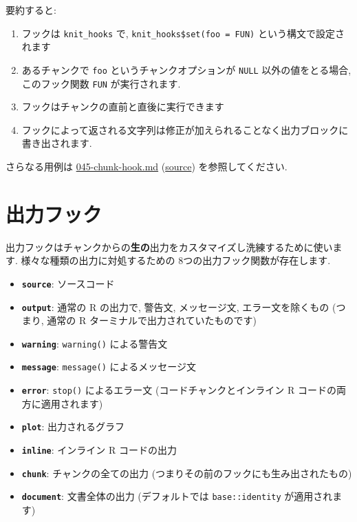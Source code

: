 \documentclass[
]{bxjsreport}
\providecommand{\tightlist}{%
  \setlength{\itemsep}{0pt}\setlength{\parskip}{0pt}}
\begin{document}
要約すると:

\begin{enumerate}
\def\labelenumi{\arabic{enumi}.}
\tightlist
\item
  フックは \texttt{knit\_hooks} で,
  \texttt{knit\_hooks\$set(foo\ =\ FUN)} という構文で設定されます
\item
  あるチャンクで \texttt{foo} というチャンクオプションが \texttt{NULL}
  以外の値をとる場合, このフック関数 \texttt{FUN} が実行されます.
\item
  フックはチャンクの直前と直後に実行できます
\item
  フックによって返される文字列は修正が加えられることなく出力ブロックに書き出されます.
\end{enumerate}

さらなる用例は
\href{https://github.com/yihui/knitr-examples/blob/master/045-chunk-hook.md}{045-chunk-hook.md}
(\href{https://github.com/yihui/knitr-examples/blob/master/045-chunk-hook.Rmd}{source})
を参照してください.

\hypertarget{ux51faux529bux30d5ux30c3ux30af}{%
\section{出力フック}\label{ux51faux529bux30d5ux30c3ux30af}}

出力フックはチャンクからの\textbf{生の}出力をカスタマイズし洗練するために使います.
様々な種類の出力に対処するための 8つの出力フック関数が存在します.

\begin{itemize}
\tightlist
\item
  \textbf{\texttt{source}}: ソースコード
\item
  \textbf{\texttt{output}}: 通常の R の出力で, 警告文, メッセージ文,
  エラー文を除くもの (つまり, 通常の R
  ターミナルで出力されていたものです)
\item
  \textbf{\texttt{warning}}: \texttt{warning()} による警告文
\item
  \textbf{\texttt{message}}: \texttt{message()} によるメッセージ文
\item
  \textbf{\texttt{error}}: \texttt{stop()} によるエラー文
  (コードチャンクとインライン R コードの両方に適用されます)
\item
  \textbf{\texttt{plot}}: 出力されるグラフ
\item
  \textbf{\texttt{inline}}: インライン R コードの出力
\item
  \textbf{\texttt{chunk}}: チャンクの全ての出力
  (つまりその前のフックにも生み出されたもの)
\item
  \textbf{\texttt{document}}: 文書全体の出力 (デフォルトでは
  \texttt{base::identity} が適用されます)
\end{itemize}
\end{document}
